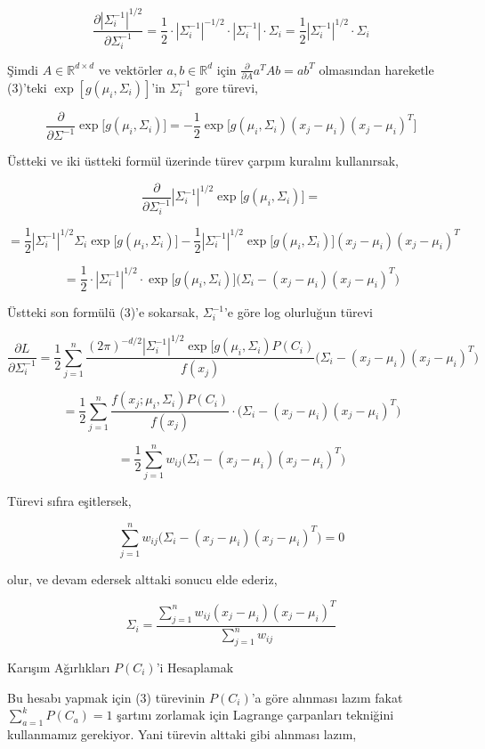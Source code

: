 \documentclass[12pt,fleqn]{article}\usepackage{../../common}
\begin{document}
$$ 
\frac{\partial |\Sigma_i^{-1}|^{1/2}}{\partial \Sigma_i^{-1}} = 
\frac{1}{2} \cdot |\Sigma_i^{-1}|^{-1/2} \cdot |\Sigma_i^{-1}| \cdot \Sigma_i  = 
\frac{1}{2} |\Sigma_i^{-1}|^{1/2} \cdot \Sigma_i
$$

Şimdi $A \in \mathbb{R}^{d \times d}$ ve vektörler $a,b \in \mathbb{R}^d$
için $\frac{\partial }{\partial A}a^TAb = ab^T$ olmasından hareketle
(3)'teki $\exp [g(\mu_i,\Sigma_i)]$'in $\Sigma_i^{-1}$ gore türevi,

$$ 
\frac{\partial }{\partial \Sigma^{-1}} \exp\big[ g(\mu_i,\Sigma_i)\big] = 
-\frac{1}{2} \exp \big[  g(\mu_i,\Sigma_i) (x_j-\mu_i)(x_j-\mu_i)^T \big]
$$

Üstteki ve iki üstteki formül üzerinde türev çarpım kuralını kullanırsak, 

$$ 
\frac{\partial }{\partial \Sigma_i^{-1}} |\Sigma_i^{-1}|^{1/2} 
\exp\big[ g(\mu_i,\Sigma_i) \big] =
$$

$$ 
= \frac{1}{2} |\Sigma_i^{-1}|^{1/2}  \Sigma_i \exp\big[ g(\mu_i,\Sigma_i) \big]-
\frac{1}{2} |\Sigma_i^{-1}|^{1/2} \exp\big[ g(\mu_i,\Sigma_i) \big]
(x_j-\mu_i)(x_j-\mu_i)^T
$$

$$ 
= \frac{1}{2} \cdot  |\Sigma_i^{-1}|^{1/2} \cdot 
\exp\big[ g(\mu_i,\Sigma_i) \big] \big( 
\Sigma_i - (x_j-\mu_i)(x_j-\mu_i)^T
\big)
$$

Üstteki son formülü (3)'e sokarsak, $\Sigma_i^{-1}$'e göre log olurluğun
türevi

$$ 
\frac{\partial L}{\partial \Sigma_i^{-1}} =
\frac{1}{2} \sum_{j=1}^{n} \frac
{(2\pi)^{-d/2} |\Sigma_i^{-1}|^{1/2}\exp\big[ g(\mu_i,\Sigma_i) P(C_i) }{f(x_j)}
\big( \Sigma_i - (x_j-\mu_i)(x_j-\mu_i)^T \big)
$$


$$ =
\frac{1}{2} \sum_{j=1}^{n} \frac{f(x_j;\mu_i,\Sigma_i) P(C_i)}{f(x_j)} \cdot
\big( \Sigma_i - (x_j-\mu_i)(x_j-\mu_i)^T \big)
$$

$$ 
= \frac{1}{2} \sum_{j=1}^{n} w_{ij} 
\big( \Sigma_i - (x_j-\mu_i)(x_j-\mu_i)^T \big)
$$

Türevi sıfıra eşitlersek,

$$ \sum_{j=1}^{n} w_{ij} \big( \Sigma_i - (x_j-\mu_i)(x_j-\mu_i)^T \big) = 0 $$

olur, ve devam edersek alttaki sonucu elde ederiz,

$$ 
\Sigma_i = \frac{\sum_{j=1}^{n} w_{ij} (x_j-\mu_i)(x_j-\mu_i)^T}
{\sum_{j=1}^{n} w_{ij}}
$$

Karışım Ağırlıkları $P(C_i)$'i Hesaplamak

Bu hesabı yapmak için (3) türevinin $P(C_i)$'a göre alınması lazım fakat 
$\sum_{a=1}^{k}P(C_a)=1$ şartını zorlamak için Lagrange çarpanları
tekniğini kullanmamız gerekiyor. Yani türevin alttaki gibi alınması lazım,
\end{document}
